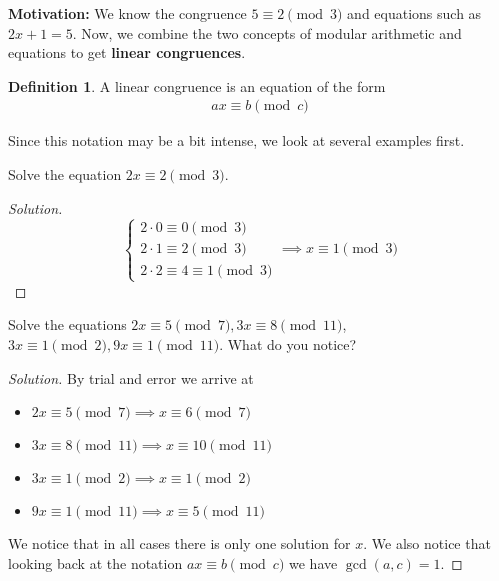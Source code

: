 \documentclass[12pt,openany]{book}
\theoremstyle{definition}
\newtheorem{defi}{Definition}[section]
\newenvironment{soln}{\begin{proof}[Solution]}{\end{proof}}
\theoremstyle{definition}
\begin{document}
\textbf{Motivation:} We know the congruence $5\equiv 2\pmod{3}$ and equations such as $2x+1=5$.  Now, we combine the two concepts of modular arithmetic and equations to get \textbf{linear congruences}.  

\begin{defi}  A linear congruence is an equation of the form \begin{align} ax\equiv b\pmod{c} \end{align}  \end{defi}

Since this notation may be a bit intense, we look at several examples first.

\begin{exmp}  Solve the equation $2x\equiv 2\pmod{3}$. \end{exmp}
\begin{soln} $$\begin{cases} 2\cdot 0\equiv 0\pmod{3}\\ 2\cdot 1\equiv 2\pmod{3} \\ 2\cdot 2\equiv 4\equiv 1\pmod{3} \end{cases}\implies x\equiv 1\pmod{3}$$ \end{soln}

\begin{exmp}  Solve the equations $2x\equiv 5\pmod{7}, 3x\equiv 8\pmod{11}$, $3x\equiv 1\pmod{2}, 9x\equiv 1\pmod{11}$.  What do you notice? \end{exmp}
\begin{soln}  By trial and error we arrive at \begin{itemize}
\item $2x\equiv 5\pmod{7}\implies x\equiv 6\pmod{7}$
\item $3x\equiv 8\pmod{11}\implies x\equiv 10\pmod{11}$
\item $3x\equiv 1\pmod{2}\implies x\equiv 1\pmod{2}$
\item $9x\equiv 1\pmod{11}\implies x\equiv 5\pmod{11}$
\end{itemize}
We notice that in all cases there is only one solution for $x$.  We also notice that looking back at the notation $ax\equiv b\pmod{c}$ we have $\gcd(a,c)=1$.    
\end{soln}
\end{document}
